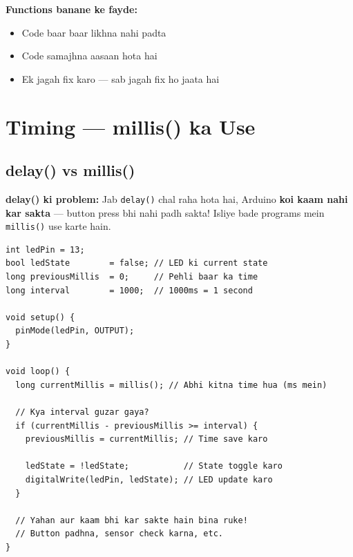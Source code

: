 \documentclass[12pt,a4paper]{article}
\begin{document}
\begin{tcolorbox}[tipbox]
\textbf{Functions banane ke fayde:}
\begin{itemize}
  \item Code baar baar likhna nahi padta
  \item Code samajhna aasaan hota hai
  \item Ek jagah fix karo — sab jagah fix ho jaata hai
\end{itemize}
\end{tcolorbox}

\newpage

\section{Timing — millis() ka Use}

\subsection{delay() vs millis()}

\begin{tcolorbox}[warnbox]
\textbf{delay() ki problem:} Jab \texttt{delay()} chal raha hota hai, Arduino \textbf{koi kaam nahi kar sakta} — button press bhi nahi padh sakta! Isliye bade programs mein \texttt{millis()} use karte hain.
\end{tcolorbox}

\begin{tcolorbox}[codebox=Example 15: millis() se Non-Blocking Blink]
\begin{lstlisting}
int ledPin = 13;
bool ledState        = false; // LED ki current state
long previousMillis  = 0;     // Pehli baar ka time
long interval        = 1000;  // 1000ms = 1 second

void setup() {
  pinMode(ledPin, OUTPUT);
}

void loop() {
  long currentMillis = millis(); // Abhi kitna time hua (ms mein)

  // Kya interval guzar gaya?
  if (currentMillis - previousMillis >= interval) {
    previousMillis = currentMillis; // Time save karo

    ledState = !ledState;           // State toggle karo
    digitalWrite(ledPin, ledState); // LED update karo
  }

  // Yahan aur kaam bhi kar sakte hain bina ruke!
  // Button padhna, sensor check karna, etc.
}
\end{lstlisting}
\end{tcolorbox}
\end{document}
